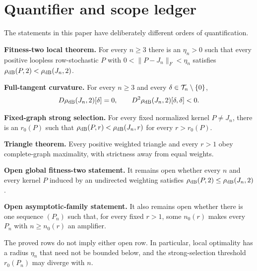 \section{Quantifier and scope ledger}\label{app:quantifiers}

The statements in this paper have deliberately different orders of
quantification.

\medskip
\noindent\textbf{Fitness-two local theorem.}
For every $n\ge3$ there is an $\eta_n>0$ such that every positive loopless
row-stochastic $P$ with $0<\|P-J_n\|_F<\eta_n$ satisfies
$\rho_{\mathrm{dB}}(P,2)<\rho_{\mathrm{dB}}(J_n,2)$.

\medskip
\noindent\textbf{Full-tangent curvature.}
For every $n\ge3$ and every $\delta\in\mathcal T_n\setminus\{0\}$,
\[
 D\rho_{\mathrm{dB}}(J_n,2)[\delta]=0,\qquad
 D^2\rho_{\mathrm{dB}}(J_n,2)[\delta,\delta]<0.
\]

\medskip
\noindent\textbf{Fixed-graph strong selection.}
For every fixed normalized kernel $P\ne J_n$, there is an $r_0(P)$
such that $\rho_{\mathrm{dB}}(P,r)<\rho_{\mathrm{dB}}(J_n,r)$ for every $r>r_0(P)$.

\medskip
\noindent\textbf{Triangle theorem.}
Every positive weighted triangle and every $r>1$ obey complete-graph
maximality, with strictness away from equal weights.

\medskip
\noindent\textbf{Open global fitness-two statement.}
It remains open whether every $n$ and every kernel $P$ induced by an
undirected weighting satisfies
$\rho_{\mathrm{dB}}(P,2)\le\rho_{\mathrm{dB}}(J_n,2)$.

\medskip
\noindent\textbf{Open asymptotic-family statement.}
It also remains open whether there is one sequence $(P_n)$ such that, for
every fixed $r>1$, some $n_0(r)$ makes every $P_n$ with $n\ge n_0(r)$ an
amplifier.

The proved rows do not imply either open row.  In particular, local
optimality has a radius $\eta_n$ that need not be bounded below, and the strong-selection threshold
$r_0(P_n)$ may diverge with $n$.
